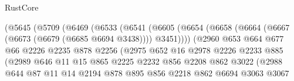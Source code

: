 \begin{lexlean}{RustCore}
\begin{coremodule}
                              (@5645
                                (@5709
                                  (@6469
                                    (@6533
                                      (@6541
                                        (@6605
                                          (@6654
                                            (@6658
                                              (@6664
                                                (@6667 (@6673 (@6679 (@6685 @6694 @3438))))
                                                @3451))))
                                        (@2960
                                          @653
                                          @664
                                          @677
                                          @66
                                          @2226
                                          @2235
                                          @878
                                          @2256
                                          (@2975
                                            @652
                                            @16
                                            @2978
                                            @2226
                                            @2233
                                            @885
                                            (@2989
                                              @646
                                              @11
                                              @15
                                              @865
                                              @2225
                                              @2232
                                              @856
                                              @2208
                                              @862
                                              @3022
                                              (@2988
                                                @644
                                                @87
                                                @11
                                                @14
                                                @2194
                                                @878
                                                @895
                                                @856
                                                @2218
                                                @862
                                                @6694
                                                @3063
                                                @3067

\end{coremodule}
\end{lexlean}
